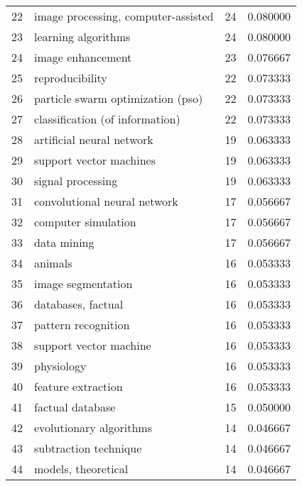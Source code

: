 \begin{tabular}{llrr}
22 &      image processing, computer-assisted &          24 &    0.080000 \\
23 &                      learning algorithms &          24 &    0.080000 \\
24 &                        image enhancement &          23 &    0.076667 \\
25 &                          reproducibility &          22 &    0.073333 \\
26 &        particle swarm optimization (pso) &          22 &    0.073333 \\
27 &          classification (of information) &          22 &    0.073333 \\
28 &                artificial neural network &          19 &    0.063333 \\
29 &                  support vector machines &          19 &    0.063333 \\
30 &                        signal processing &          19 &    0.063333 \\
31 &             convolutional neural network &          17 &    0.056667 \\
32 &                      computer simulation &          17 &    0.056667 \\
33 &                              data mining &          17 &    0.056667 \\
34 &                                  animals &          16 &    0.053333 \\
35 &                       image segmentation &          16 &    0.053333 \\
36 &                       databases, factual &          16 &    0.053333 \\
37 &                      pattern recognition &          16 &    0.053333 \\
38 &                   support vector machine &          16 &    0.053333 \\
39 &                               physiology &          16 &    0.053333 \\
40 &                       feature extraction &          16 &    0.053333 \\
41 &                         factual database &          15 &    0.050000 \\
42 &                  evolutionary algorithms &          14 &    0.046667 \\
43 &                    subtraction technique &          14 &    0.046667 \\
44 &                      models, theoretical &          14 &    0.046667 \\

\end{tabular}

